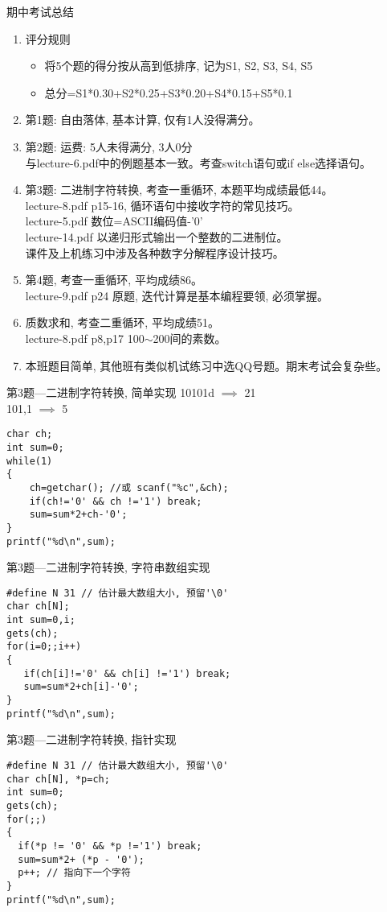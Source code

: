 \begin{frame}{期中考试总结}
\begin{enumerate}
	\item 评分规则
	\begin{itemize}
		\item 将5个题的得分按从高到低排序, 记为S1, S2, S3, S4, S5
		\item 总分=S1*0.30+S2*0.25+S3*0.20+S4*0.15+S5*0.1
	\end{itemize}
	\item 第1题: 自由落体, 基本计算, 仅有1人没得满分。
	\item 第2题: 运费: 5人未得满分, 3人0分\\ 
	与lecture-6.pdf中的例题基本一致。考查switch语句或if else选择语句。
	\item 第3题: 二进制字符转换, 考查一重循环, 本题平均成绩最低44。\\
	lecture-8.pdf p15-16, 循环语句中接收字符的常见技巧。\\
	lecture-5.pdf 数位=ASCII编码值-'0'\\
	lecture-14.pdf 以递归形式输出一个整数的二进制位。\\
	课件及上机练习中涉及各种数字分解程序设计技巧。
	\item 第4题, 考查一重循环, 平均成绩86。\\
	lecture-9.pdf p24 原题, 迭代计算是基本编程要领, 必须掌握。
	\item 质数求和, 考查二重循环, 平均成绩51。\\
	lecture-8.pdf p8,p17 100$\sim$200间的素数。
	\item 本班题目简单, 其他班有类似机试练习中选QQ号题。期末考试会复杂些。
\end{enumerate}
\end{frame}

\begin{frame}[fragile]{第3题---二进制字符转换, 简单实现}
10101d $\implies$ 21\\
101,1  $\implies$ 5
\begin{lstlisting}
char ch;
int sum=0;
while(1)
{
    ch=getchar(); //或 scanf("%c",&ch);
    if(ch!='0' && ch !='1') break;
    sum=sum*2+ch-'0';
} 
printf("%d\n",sum);
\end{lstlisting}
\end{frame}

\begin{frame}[fragile]{第3题---二进制字符转换, 字符串数组实现}
\begin{lstlisting}
#define N 31 // 估计最大数组大小, 预留'\0'
char ch[N];
int sum=0,i;
gets(ch);
for(i=0;;i++)
{
   if(ch[i]!='0' && ch[i] !='1') break;
   sum=sum*2+ch[i]-'0';
} 
printf("%d\n",sum);
\end{lstlisting}
\end{frame}

\begin{frame}[fragile]{第3题---二进制字符转换, 指针实现}
\begin{lstlisting}
#define N 31 // 估计最大数组大小, 预留'\0'
char ch[N], *p=ch;
int sum=0;
gets(ch);
for(;;)
{
  if(*p != '0' && *p !='1') break;
  sum=sum*2+ (*p - '0');
  p++; // 指向下一个字符
} 
printf("%d\n",sum);
\end{lstlisting}
\end{frame}




